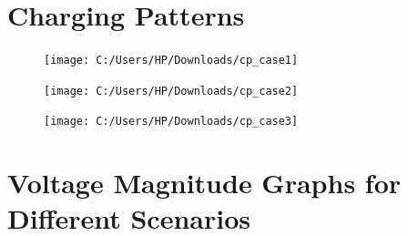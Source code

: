 	\section{Charging Patterns}
			\begin{figure}
				\centering
				\texttt{[image: C:/Users/HP/Downloads/cp\_case1]}
				\caption{}
				\label{fig:cpcase1}
			\end{figure}
			\begin{figure}
				\centering
				\texttt{[image: C:/Users/HP/Downloads/cp\_case2]}
				\caption{}
				\label{fig:cpcase2}
			\end{figure}
		
			\begin{figure}
				\centering
				\texttt{[image: C:/Users/HP/Downloads/cp\_case3]}
				\caption{}
				\label{fig:cpcase3}
			\end{figure}
			
			
			
			
			
			
			
	\section{Voltage Magnitude Graphs for Different Scenarios}
	

